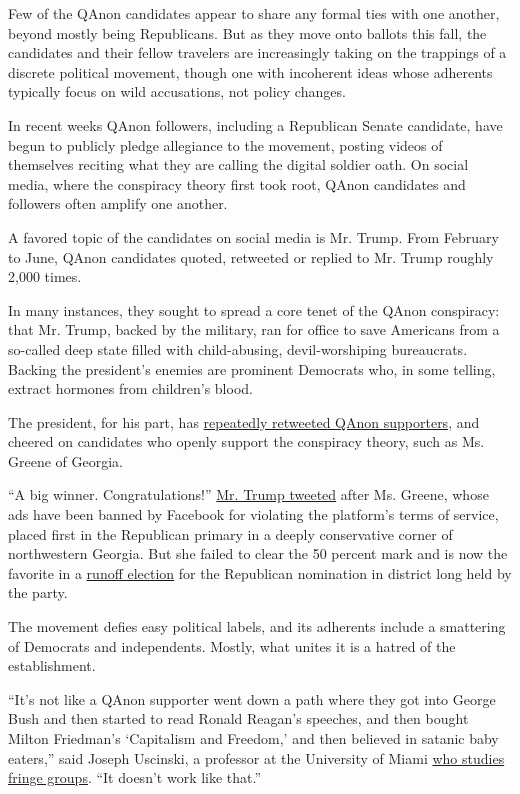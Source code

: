 Few of the QAnon candidates appear to share any formal ties with one
another, beyond mostly being Republicans. But as they move onto ballots
this fall, the candidates and their fellow travelers are increasingly
taking on the trappings of a discrete political movement, though one
with incoherent ideas whose adherents typically focus on wild
accusations, not policy changes.

In recent weeks QAnon followers, including a Republican Senate
candidate, have begun to publicly pledge allegiance to the movement,
posting videos of themselves reciting what they are calling the digital
soldier oath. On social media, where the conspiracy theory first took
root, QAnon candidates and followers often amplify one another.

A favored topic of the candidates on social media is Mr. Trump. From
February to June, QAnon candidates quoted, retweeted or replied to Mr.
Trump roughly 2,000 times.

In many instances, they sought to spread a core tenet of the QAnon
conspiracy: that Mr. Trump, backed by the military, ran for office to
save Americans from a so-called deep state filled with child-abusing,
devil-worshiping bureaucrats. Backing the president's enemies are
prominent Democrats who, in some telling, extract hormones from
children's blood.

The president, for his part, has
\href{https://www.politico.com/news/2020/07/12/trump-tweeting-qanon-followers-357238}{repeatedly
retweeted QAnon supporters}, and cheered on candidates who openly
support the conspiracy theory, such as Ms. Greene of Georgia.

``A big winner. Congratulations!''
\href{https://twitter.com/realDonaldTrump/status/1271428819296157697?s=20}{Mr.
Trump tweeted} after Ms. Greene, whose ads have been banned by Facebook
for violating the platform's terms of service, placed first in the
Republican primary in a deeply conservative corner of northwestern
Georgia. But she failed to clear the 50 percent mark and is now the
favorite in a
\href{https://www.nytimes.com/2020/06/17/us/marjorie-taylor-greene-georgia.html}{runoff
election} for the Republican nomination in district long held by the
party.

The movement defies easy political labels, and its adherents include a
smattering of Democrats and independents. Mostly, what unites it is a
hatred of the establishment.

``It's not like a QAnon supporter went down a path where they got into
George Bush and then started to read Ronald Reagan's speeches, and then
bought Milton Friedman's `Capitalism and Freedom,' and then believed in
satanic baby eaters,'' said Joseph Uscinski, a professor at the
University of Miami \href{https://www.joeuscinski.com/}{who studies
fringe groups}. ``It doesn't work like that.''

